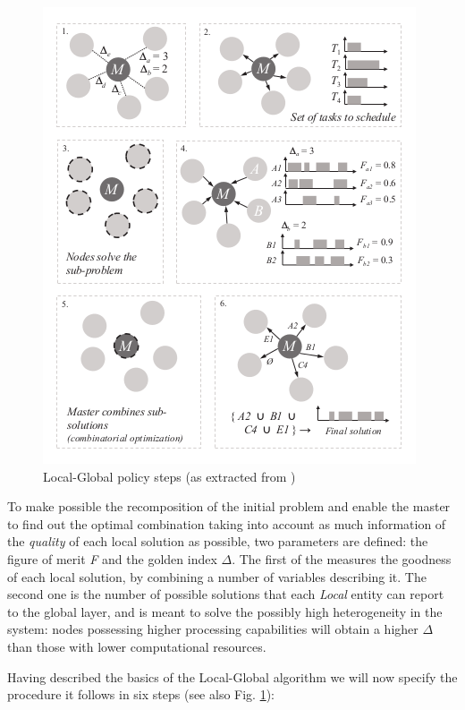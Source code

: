 \begin{figure}[h!]
\centering
\includegraphics[scale=0.5]{Figures/LGsteps.png} 
\caption{Local-Global policy steps (as extracted from \cite{Araguz15})}
\label{LGsteps}
\end{figure}

To make possible the recomposition of the initial problem and enable the master to find out the optimal combination taking into account as much information of the \emph{quality} of each local solution as possible, two parameters are defined: the figure of merit \emph{F} and the golden index $ \Delta $. The first of the measures the goodness of each local solution, by combining a number of variables describing it. The second one is the number of possible solutions that each \emph{Local} entity can report to the global layer, and is meant to solve the possibly high heterogeneity in the system: nodes possessing higher processing capabilities will obtain a higher $ \Delta $ than those with lower computational resources.

Having described the basics of the Local-Global algorithm we will now specify the procedure it follows in six steps (see also Fig. \ref{LGsteps}):

